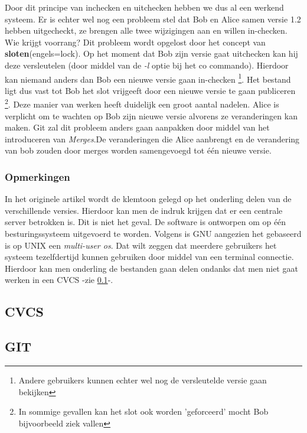 Door dit principe van inchecken en uitchecken hebben we dus al een werkend systeem. Er is echter wel nog een probleem stel dat Bob en Alice samen versie 1.2 hebben uitgecheckt, ze brengen alle twee wijzigingen aan en willen in-checken. Wie krijgt voorrang? Dit probleem wordt opgelost door het concept van \textbf{sloten}(engels=lock). Op het moment dat  Bob zijn versie gaat uitchecken kan hij deze versleutelen (door middel van de \textit{-l} optie bij het co commando). Hierdoor kan niemand anders dan Bob een nieuwe versie gaan in-checken \footnote{Andere gebruikers kunnen echter wel nog de versleutelde versie gaan bekijken}. Het bestand ligt dus vast tot Bob het slot vrijgeeft door een nieuwe versie te gaan publiceren \footnote{In sommige gevallen kan het slot ook worden 'geforceerd' mocht Bob bijvoorbeeld ziek vallen}. Deze manier van werken heeft duidelijk een groot aantal nadelen. Alice is verplicht om te wachten op Bob zijn nieuwe versie alvorens ze veranderingen kan maken. Git zal dit probleem anders gaan aanpakken door middel van het introduceren van \textit{Merges}.De veranderingen die Alice aanbrengt en de verandering van bob zouden door merges worden samengevoegd tot één nieuwe versie.\\

\label{par:branches}

\subsubsection{Opmerkingen}
In het originele artikel wordt de klemtoon gelegd op het onderling delen van de verschillende versies. Hierdoor kan men de indruk krijgen dat er een centrale server betrokken is. Dit is niet het geval. De software is ontworpen om op één besturingssysteem uitgevoerd te worden. Volgens \textcite{Debian2020} is GNU aangezien het gebaseerd is op UNIX een \textit{multi-user os}. Dat wilt zeggen dat meerdere gebruikers het systeem tezelfdertijd kunnen gebruiken door middel van een terminal connectie. Hierdoor kan men onderling de bestanden gaan delen ondanks dat men niet gaat werken in een CVCS -zie \ref{sec:CVCS}-.

\subsection{CVCS}
\label{sec:CVCS}

\subsection{GIT}
\label{sec:GIT}
